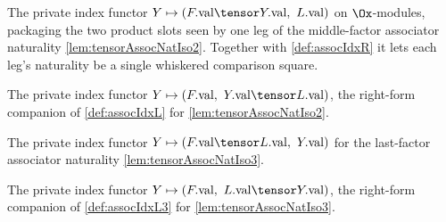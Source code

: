 \begin{definition}

  \label{def:assocIdxL}
  The private index functor $Y \mapsto (F.\mathrm{val} \tensor Y.\mathrm{val},\ L.\mathrm{val})$
  on $\Ox$-modules, packaging the two product slots seen by one leg of the middle-factor
  associator naturality \cref{lem:tensorAssocNatIso2}. Together with \cref{def:assocIdxR} it
  lets each leg's naturality be a single whiskered comparison square.
\end{definition}

\begin{definition}

  \label{def:assocIdxR}
  The private index functor $Y \mapsto (F.\mathrm{val},\ Y.\mathrm{val} \tensor L.\mathrm{val})$,
  the right-form companion of \cref{def:assocIdxL} for \cref{lem:tensorAssocNatIso2}.
\end{definition}

\begin{definition}

  \label{def:assocIdxL3}
  The private index functor $Y \mapsto (F.\mathrm{val} \tensor L.\mathrm{val},\ Y.\mathrm{val})$
  for the last-factor associator naturality \cref{lem:tensorAssocNatIso3}.
\end{definition}

\begin{definition}

  \label{def:assocIdxR3}
  The private index functor $Y \mapsto (F.\mathrm{val},\ L.\mathrm{val} \tensor Y.\mathrm{val})$,
  the right-form companion of \cref{def:assocIdxL3} for \cref{lem:tensorAssocNatIso3}.
\end{definition}

